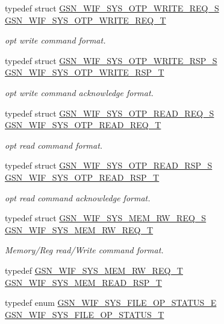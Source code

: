 \begin{DoxyCompactItemize}
typedef struct \hyperlink{a00360}{GSN\_\-WIF\_\-SYS\_\-OTP\_\-WRITE\_\-REQ\_\-S} \hyperlink{a00639_gaa1cf18e499f7fd325969144c10fdd54a}{GSN\_\-WIF\_\-SYS\_\-OTP\_\-WRITE\_\-REQ\_\-T}
\begin{DoxyCompactList}\small\item\em opt write command format. \end{DoxyCompactList}\item 
typedef struct \hyperlink{a00361}{GSN\_\-WIF\_\-SYS\_\-OTP\_\-WRITE\_\-RSP\_\-S} \hyperlink{a00639_gac6f93d0889c0fdbf82aa2e0af7c0d988}{GSN\_\-WIF\_\-SYS\_\-OTP\_\-WRITE\_\-RSP\_\-T}
\begin{DoxyCompactList}\small\item\em opt write command acknowledge format. \end{DoxyCompactList}\item 
typedef struct \hyperlink{a00358}{GSN\_\-WIF\_\-SYS\_\-OTP\_\-READ\_\-REQ\_\-S} \hyperlink{a00639_gab7804e5393f417c861691706760684ef}{GSN\_\-WIF\_\-SYS\_\-OTP\_\-READ\_\-REQ\_\-T}
\begin{DoxyCompactList}\small\item\em opt read command format. \end{DoxyCompactList}\item 
typedef struct \hyperlink{a00359}{GSN\_\-WIF\_\-SYS\_\-OTP\_\-READ\_\-RSP\_\-S} \hyperlink{a00639_gae38db03f3f15f58fb7e7d6bcdc07474a}{GSN\_\-WIF\_\-SYS\_\-OTP\_\-READ\_\-RSP\_\-T}
\begin{DoxyCompactList}\small\item\em opt read command acknowledge format. \end{DoxyCompactList}\item 
typedef struct \hyperlink{a00357}{GSN\_\-WIF\_\-SYS\_\-MEM\_\-RW\_\-REQ\_\-S} \hyperlink{a00639_ga9e7044ea584df3b45c6e9811e5de6731}{GSN\_\-WIF\_\-SYS\_\-MEM\_\-RW\_\-REQ\_\-T}
\begin{DoxyCompactList}\small\item\em Memory/Reg read/Write command format. \end{DoxyCompactList}\item 
typedef \hyperlink{a00357}{GSN\_\-WIF\_\-SYS\_\-MEM\_\-RW\_\-REQ\_\-T} \hyperlink{a00612_a84498c5c575611f447294242aea8a874}{GSN\_\-WIF\_\-SYS\_\-MEM\_\-READ\_\-RSP\_\-T}
\item 
typedef enum \hyperlink{a00639_ga4ab9f7b6980d4b5c3f3a0199250b8923}{GSN\_\-WIF\_\-SYS\_\-FILE\_\-OP\_\-STATUS\_\-E} \hyperlink{a00639_gafae04713b42d9bf1e40e2f94397416e3}{GSN\_\-WIF\_\-SYS\_\-FILE\_\-OP\_\-STATUS\_\-T}

\end{DoxyCompactItemize}

